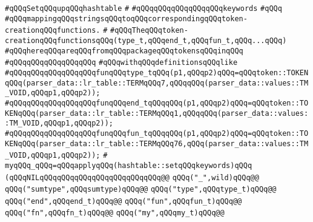 \newline
\verb|#qQQqSetqQQqupqQQqhashtable|\newline
\verb|#|\newline
\verb|#qQQqqQQqqQQqqQQqqQQqkeywords|\newline
\verb|#qQQq|\newline
\verb|#qQQqmappingqQQqstringsqQQqtoqQQqcorrespondingqQQqtoken-creationqQQqfunctions.|\newline
\verb|#|\newline
\verb|#qQQqTheqQQqtoken-creationqQQqfunctionsqQQq(type_t,qQQqend_t,qQQqfun_t,qQQq...qQQq)|\newline
\verb|#qQQqhereqQQqareqQQqfromqQQqpackageqQQqtokensqQQqinqQQq|\newline
\verb|#qQQqqQQqqQQqqQQqqQQq|\newline
\verb|#qQQqwithqQQqdefinitionsqQQqlike|\newline
\verb|#qQQqqQQqqQQqqQQqqQQqfunqQQqtype_tqQQq(p1,qQQqp2)qQQq=qQQqtoken::TOKENqQQq(parser_data::lr_table::TERMqQQq7,qQQqqQQq(parser_data::values::TM_VOID,qQQqp1,qQQqp2));|\newline
\verb|#qQQqqQQqqQQqqQQqqQQqfunqQQqend_tqQQqqQQq(p1,qQQqp2)qQQq=qQQqtoken::TOKENqQQq(parser_data::lr_table::TERMqQQq1,qQQqqQQq(parser_data::values::TM_VOID,qQQqp1,qQQqp2));|\newline
\verb|#qQQqqQQqqQQqqQQqqQQqfunqQQqfun_tqQQqqQQq(p1,qQQqp2)qQQq=qQQqtoken::TOKENqQQq(parser_data::lr_table::TERMqQQq76,qQQq(parser_data::values::TM_VOID,qQQqp1,qQQqp2));|\newline
\verb|#|\newline
\verb|myqQQq_qQQq=qQQqapplyqQQq(hashtable::setqQQqkeywords)qQQq|\newline
\verb|(qQQqNILqQQqqQQqqQQqqQQqqQQqqQQqqQQq@@|\newline
\verb|qQQq("_",wild)qQQq@@|\newline
\verb|qQQq("sumtype",qQQqsumtype)qQQq@@|\newline
\verb|qQQq("type",qQQqtype_t)qQQq@@|\newline
\verb|qQQq("end",qQQqend_t)qQQq@@|\newline
\verb|qQQq("fun",qQQqfun_t)qQQq@@|\newline
\verb|qQQq("fn",qQQqfn_t)qQQq@@|\newline
\verb|qQQq("my",qQQqmy_t)qQQq@@|\newline
